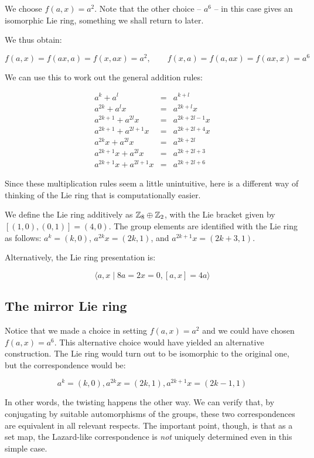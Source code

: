 \documentclass[10pt]{amsart}
\begin{document}
We choose $f(a,x) = a^2$. Note that the other choice -- $a^6$ -- in
this case gives an isomorphic Lie ring, something we shall return to
later.

We thus obtain:

$$f(a,x) = f(ax,a) = f(x,ax) = a^2, \qquad f(x,a) = f(a,ax) = f(ax,x) = a^6$$

We can use this to work out the general addition rules:

\begin{eqnarray*}
  a^k + a^l & = & a^{k+l}\\
  a^{2k} + a^lx & = & a^{2k+l}x\\
  a^{2k+1} + a^{2l}x & = & a^{2k + 2l-1}x\\
  a^{2k+1} + a^{2l+1}x & = & a^{2k + 2l + 4}x\\
  a^{2k}x + a^{2l}x & = & a^{2k + 2l}\\
  a^{2k+1}x + a^{2l}x & = & a^{2k+2l+3}\\
  a^{2k+1}x + a^{2l+1}x & = & a^{2k+2l+6}
\end{eqnarray*}

Since these multiplication rules seem a little unintuitive, here is a
different way of thinking of the Lie ring that is computationally
easier. 

We define the Lie ring additively as $\mathbb{Z}_8 \oplus \mathbb{Z}_2$, with the Lie
bracket given by $[(1,0),(0,1)] = (4,0)$. The group elements are
identified with the Lie ring as follows: $a^k = (k,0)$, $a^{2k}x =
(2k,1)$, and $a^{2k+1}x = (2k+3,1)$.

Alternatively, the Lie ring presentation is:

$$\langle a,x \mid 8a = 2x = 0, [a,x] = 4a \rangle$$

\subsection{The mirror Lie ring}

Notice that we made a choice in setting $f(a,x) = a^2$ and we could
have chosen $f(a,x) = a^6$. This alternative choice would have yielded
an alternative construction. The Lie ring would turn out to be
isomorphic to the original one, but the correspondence would be:

$$a^k = (k,0), a^{2k}x = (2k,1), a^{2k+1}x = (2k-1,1)$$

In other words, the twisting happens the other way. We can verify
that, by conjugating by suitable automorphisms of the groups, these
two correspondences are equivalent in all relevant respects. The
important point, though, is that as a set map, the Lazard-like
correspondence is {\em not} uniquely determined even in this simple
case.
\end{document}
